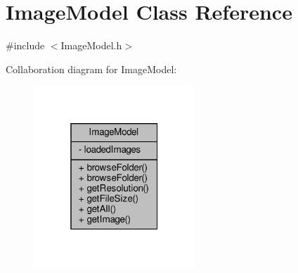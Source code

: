 \hypertarget{classImageModel}{}\section{Image\+Model Class Reference}
\label{classImageModel}


{\ttfamily \#include $<$Image\+Model.\+h$>$}



Collaboration diagram for Image\+Model\+:
\nopagebreak
\begin{figure}[H]
\begin{center}
\leavevmode
\includegraphics[width=172pt]{classImageModel__coll__graph}
\end{center}
\end{figure}
